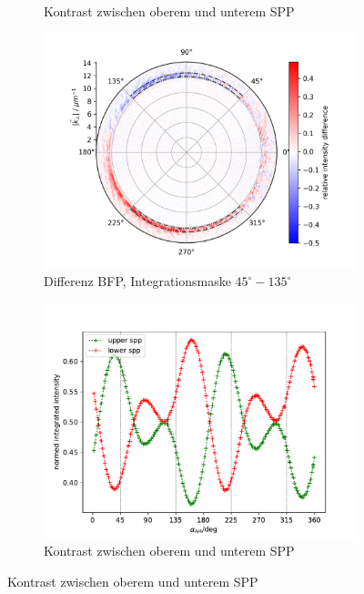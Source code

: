 \documentclass[titlepage]{article}
\begin{document}
\begin{figure}
\begin{subfigure}[b]{0.49\textwidth}
			\caption{Kontrast zwischen oberem und unterem SPP}
			\label{fig:intensity_back}
		\end{subfigure}
		
		\begin{subfigure}[b]{0.5\textwidth}
			\centering
			\includegraphics[width=\textwidth]{figures/spin_hall/diff_mid.png}
			\caption{Differenz BFP, Integrationsmaske $45^\circ-135^\circ$}
			\label{fig:diff_mid}
		\end{subfigure}
		\hfill
		\begin{subfigure}[b]{0.49\textwidth}
			\centering
			\includegraphics[width=\textwidth]{figures/spin_hall/intensity_mid.pdf}
			\caption{Kontrast zwischen oberem und unterem SPP}
			\label{fig:intensity_mid}
		\end{subfigure}
		

\end{figure}
\end{document}
